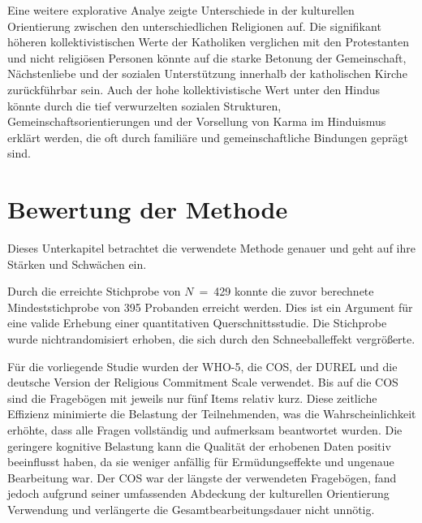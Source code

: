 Eine weitere explorative Analye zeigte Unterschiede in der kulturellen Orientierung zwischen den unterschiedlichen Religionen auf. Die signifikant höheren kollektivistischen Werte der Katholiken verglichen mit den Protestanten und nicht religiösen Personen könnte auf die starke Betonung der Gemeinschaft, Nächstenliebe und der sozialen Unterstützung innerhalb der katholischen Kirche zurückführbar sein. Auch der hohe kollektivistische Wert unter den Hindus könnte durch die tief verwurzelten sozialen Strukturen, Gemeinschaftsorientierungen und der Vorsellung von Karma im Hinduismus erklärt werden, die oft durch familiäre und gemeinschaftliche Bindungen geprägt sind.


\section{Bewertung der Methode}   \label{sec_5.3}
Dieses Unterkapitel betrachtet die verwendete Methode genauer und geht auf ihre Stärken und Schwächen ein. 

Durch die erreichte Stichprobe von $N$~=~429 konnte die zuvor berechnete Mindeststichprobe von 395 Probanden erreicht werden. Dies ist ein Argument für eine valide Erhebung einer quantitativen Querschnittsstudie. Die Stichprobe wurde nichtrandomisiert erhoben, die sich durch den Schneeballeffekt vergrößerte.

Für die vorliegende Studie wurden der WHO-5, die COS, der DUREL und die deutsche Version der Religious Commitment Scale verwendet. Bis auf die COS sind die Fragebögen mit jeweils nur fünf Items relativ kurz. Diese zeitliche Effizienz minimierte die Belastung der Teilnehmenden, was die Wahrscheinlichkeit erhöhte, dass alle Fragen vollständig und aufmerksam beantwortet wurden. Die geringere kognitive Belastung kann die Qualität der erhobenen Daten positiv beeinflusst haben, da sie weniger anfällig für Ermüdungseffekte und ungenaue Bearbeitung war. Der COS war der längste der verwendeten Fragebögen, fand jedoch aufgrund seiner umfassenden Abdeckung der kulturellen Orientierung Verwendung und verlängerte die Gesamtbearbeitungsdauer nicht unnötig.

